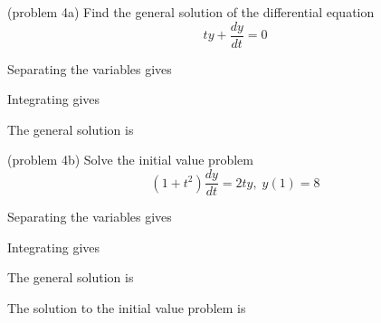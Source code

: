 \documentclass[handout]{ximera}
\begin{document}
\begin{problem}(problem 4a)
Find the general solution of the differential equation
\[
ty + \frac{dy}{dt} = 0
\]

Separating the variables gives

\begin{multipleChoice}
\end{multipleChoice}

Integrating gives

\begin{multipleChoice}
\end{multipleChoice}

The general solution is

\begin{multipleChoice}
\end{multipleChoice}

\end{problem}



\begin{problem}(problem 4b)
Solve the initial value problem
\[
(1+t^2)\frac{dy}{dt} = 2ty, \; y(1) = 8
\]

Separating the variables gives

\begin{multipleChoice}
\end{multipleChoice}

Integrating gives

\begin{multipleChoice}
\end{multipleChoice}

The general solution is

\begin{multipleChoice}
\end{multipleChoice}

The solution to the initial value problem is

\begin{multipleChoice}
\end{multipleChoice}

\end{problem}
\end{document}
